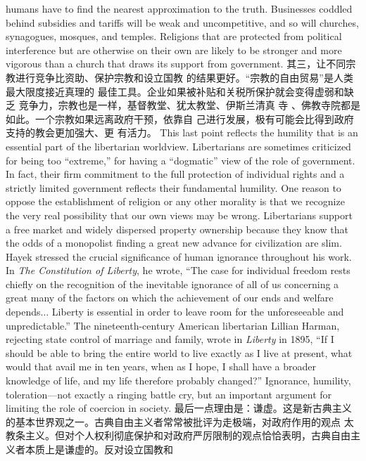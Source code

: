 \begin{paracol}{2}
humans have to find the nearest approximation to the truth.
Businesses coddled behind subsidies and tariffs will be weak
and uncompetitive, and so will churches, synagogues, mosques,
and temples. Religions that are protected from political interference but are otherwise on their own are likely to be stronger
and more vigorous than a church that draws its support from
government.
\switchcolumn
其三，让不同宗教进行竞争比资助、保护宗教和设立国教
的结果更好。“宗教的自由贸易”是人类最大限度接近真理的
最佳工具。企业如果被补贴和关税所保护就会变得虚弱和缺乏
竞争力，宗教也是一样，基督教堂、犹太教堂、伊斯兰清真
寺 、佛教寺院都是如此。一个宗教如果远离政府干预，依靠自
己进行发展，极有可能会比得到政府支持的教会更加强大、更
有活力。
\switchcolumn*
This last point reflects the humility that is an essential part of
the libertarian worldview. Libertarians are sometimes criticized
for being too ``extreme,'' for having a ``dogmatic'' view of the
role of government. In fact, their firm commitment to the full
protection of individual rights and a strictly limited government reflects their fundamental humility. One reason to oppose
the establishment of religion or any other morality is that we
recognize the very real possibility that our own views may be
wrong. Libertarians support a free market and widely dispersed
property ownership because they know that the odds of a monopolist finding a great new advance for civilization are slim.
Hayek stressed the crucial significance of human ignorance
throughout his work. In \textit{The Constitution of Liberty}, he wrote, ``The case for individual freedom rests chiefly on the recognition
of the inevitable ignorance of all of us concerning a great many
of the factors on which the achievement of our ends and welfare
depends$\ldots$ Liberty is essential in order to leave room for the
unforeseeable and unpredictable.'' The nineteenth-century
American libertarian Lillian Harman, rejecting state control of
marriage and family, wrote in \textit{Liberty} in 1895, ``If I should be
able to bring the entire world to live exactly as I live at present,
what would that avail me in ten years, when as I hope, I shall
have a broader knowledge of life, and my life therefore probably
changed?'' Ignorance, humility, toleration---not exactly a ringing battle cry, but an important argument for limiting the role
of coercion in society.
\switchcolumn
最后一点理由是：谦虚。这是新古典主义的基本世界观之一。古典自由主义者常常被批评为走极端，对政府作用的观点
太教条主义。但对个人权利彻底保护和对政府严厉限制的观点恰恰表明，古典自由主义者本质上是谦虚的。反对设立国教和

\end{paracol}
